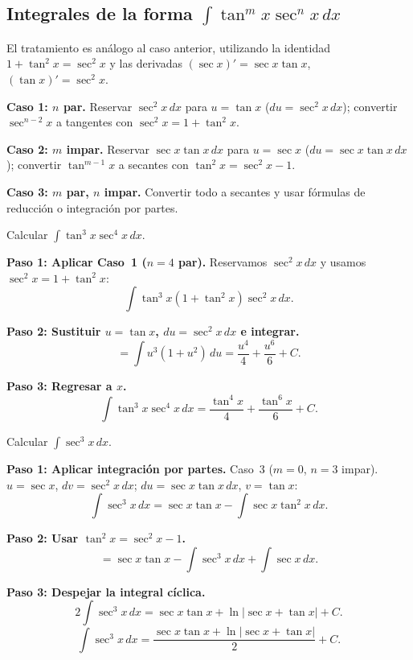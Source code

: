 \subsection{Integrales de la forma $\int \tan^m x \sec^n x \, dx$}

El tratamiento es análogo al caso anterior, utilizando la identidad
$1+\tan^2 x = \sec^2 x$ y las derivadas $(\sec x)' = \sec x\tan x$,
$(\tan x)' = \sec^2 x$.

\begin{pasos}
\textbf{Caso 1: $n$ par.} Reservar $\sec^2 x\,dx$ para $u = \tan x$
($du = \sec^2 x\,dx$); convertir $\sec^{n-2}\!x$ a tangentes con
$\sec^2 x = 1+\tan^2 x$.

\textbf{Caso 2: $m$ impar.} Reservar $\sec x\tan x\,dx$ para $u = \sec x$
($du = \sec x\tan x\,dx$); convertir $\tan^{m-1}\!x$ a secantes con
$\tan^2 x = \sec^2 x - 1$.

\textbf{Caso 3: $m$ par, $n$ impar.} Convertir todo a secantes y usar
fórmulas de reducción o integración por partes.
\end{pasos}

\begin{example}
Calcular $\displaystyle\int \tan^3 x \sec^4 x \, dx$.

\begin{myproof}

\textbf{Paso 1: Aplicar Caso~1 ($n=4$ par).}
Reservamos $\sec^2 x\,dx$ y usamos $\sec^2 x = 1+\tan^2 x$:
\[
\int \tan^3 x(1+\tan^2 x)\sec^2 x\, dx.
\]

\textbf{Paso 2: Sustituir $u = \tan x$, $du = \sec^2 x\,dx$ e integrar.}
\[
= \int u^3(1+u^2)\, du = \frac{u^4}{4} + \frac{u^6}{6} + C.
\]

\textbf{Paso 3: Regresar a $x$.}
\[
\boxed{\int \tan^3 x \sec^4 x \, dx = \frac{\tan^4 x}{4} + \frac{\tan^6 x}{6} + C.}
\]
\end{myproof}
\end{example}

\begin{example}
Calcular $\displaystyle\int \sec^3 x\, dx$.

\begin{myproof}

\textbf{Paso 1: Aplicar integración por partes.}
Caso~3 ($m=0$, $n=3$ impar). $u = \sec x$, $dv = \sec^2 x\,dx$; $du = \sec x\tan x\,dx$, $v = \tan x$:
\[
\int \sec^3 x\, dx = \sec x\tan x - \int \sec x\tan^2 x\, dx.
\]

\textbf{Paso 2: Usar $\tan^2 x = \sec^2 x - 1$.}
\[
= \sec x\tan x - \int \sec^3 x\, dx + \int \sec x\, dx.
\]

\textbf{Paso 3: Despejar la integral cíclica.}
\[
2\int \sec^3 x\, dx = \sec x\tan x + \ln|\sec x+\tan x| + C.
\]
\[
\boxed{\int \sec^3 x\, dx = \frac{\sec x\tan x + \ln|\sec x+\tan x|}{2} + C.}
\]
\end{myproof}
\end{example}

